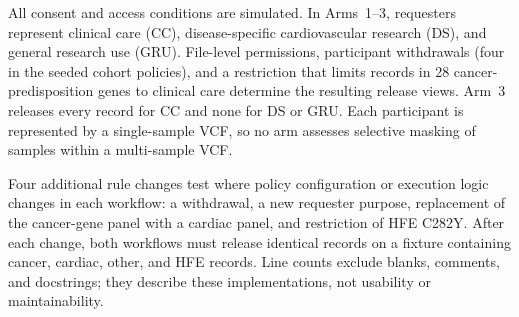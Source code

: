 \documentclass[11pt]{article}
\begin{document}
All consent and access conditions are simulated.
In Arms~1--3, requesters represent clinical care (CC), disease-specific cardiovascular research (DS), and general research use (GRU).
File-level permissions, participant withdrawals (four in the seeded cohort policies), and a restriction that limits records in 28 cancer-predisposition genes to clinical care determine the resulting release views.
Arm~3 releases every record for CC and none for DS or GRU.
Each participant is represented by a single-sample VCF, so no arm assesses selective masking of samples within a multi-sample VCF.

Four additional rule changes test where policy configuration or execution logic changes in each workflow: a withdrawal, a new requester purpose, replacement of the cancer-gene panel with a cardiac panel, and restriction of HFE C282Y.
After each change, both workflows must release identical records on a fixture containing cancer, cardiac, other, and HFE records.
Line counts exclude blanks, comments, and docstrings; they describe these implementations, not usability or maintainability.
\end{document}
